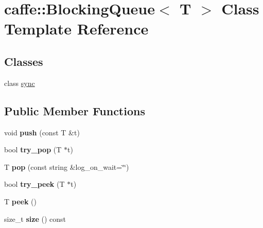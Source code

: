 \hypertarget{classcaffe_1_1BlockingQueue}{}\section{caffe\+:\+:Blocking\+Queue$<$ T $>$ Class Template Reference}
\label{classcaffe_1_1BlockingQueue}
\subsection*{Classes}
\begin{DoxyCompactItemize}
\item 
class \hyperlink{classcaffe_1_1BlockingQueue_1_1sync}{sync}
\end{DoxyCompactItemize}
\subsection*{Public Member Functions}
\begin{DoxyCompactItemize}
\item 
void {\bfseries push} (const T \&t)\hypertarget{classcaffe_1_1BlockingQueue_a44d2dc9d99dfa528daeff70f35293e72}{}\label{classcaffe_1_1BlockingQueue_a44d2dc9d99dfa528daeff70f35293e72}

\item 
bool {\bfseries try\+\_\+pop} (T $\ast$t)\hypertarget{classcaffe_1_1BlockingQueue_aa9da66a1c4f5954f46e207ce3f41bd9b}{}\label{classcaffe_1_1BlockingQueue_aa9da66a1c4f5954f46e207ce3f41bd9b}

\item 
T {\bfseries pop} (const string \&log\+\_\+on\+\_\+wait=\char`\"{}\char`\"{})\hypertarget{classcaffe_1_1BlockingQueue_ac49d1dc517a8d963508225750ce1e80d}{}\label{classcaffe_1_1BlockingQueue_ac49d1dc517a8d963508225750ce1e80d}

\item 
bool {\bfseries try\+\_\+peek} (T $\ast$t)\hypertarget{classcaffe_1_1BlockingQueue_aad3abc02b80d1a544674ac9634fb4ebd}{}\label{classcaffe_1_1BlockingQueue_aad3abc02b80d1a544674ac9634fb4ebd}

\item 
T {\bfseries peek} ()\hypertarget{classcaffe_1_1BlockingQueue_a7e767426fc1deebc6bb4626c3e54964b}{}\label{classcaffe_1_1BlockingQueue_a7e767426fc1deebc6bb4626c3e54964b}

\item 
size\+\_\+t {\bfseries size} () const \hypertarget{classcaffe_1_1BlockingQueue_a4739d1be5e182ae2c4675f60c2d264d8}{}\label{classcaffe_1_1BlockingQueue_a4739d1be5e182ae2c4675f60c2d264d8}

\end{DoxyCompactItemize}

